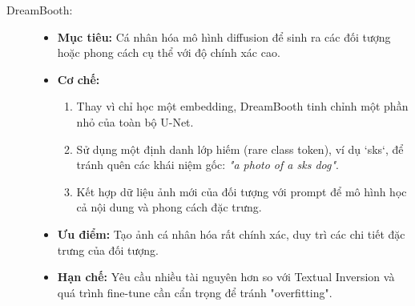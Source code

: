 \begin{description}
	\item[DreamBooth:] \cite{Ruiz2023_dreambooth}
	\begin{itemize}
		\item \textbf{Mục tiêu:} Cá nhân hóa mô hình diffusion để sinh ra các đối tượng hoặc phong cách cụ thể với độ chính xác cao.
		\item \textbf{Cơ chế:} 
		\begin{enumerate}
			\item Thay vì chỉ học một embedding, DreamBooth tinh chỉnh một phần nhỏ của toàn bộ U-Net.
			\item Sử dụng một định danh lớp hiếm (rare class token), ví dụ `sks`, để tránh quên các khái niệm gốc: \textit{"a photo of a sks dog"}.
			\item Kết hợp dữ liệu ảnh mới của đối tượng với prompt để mô hình học cả nội dung và phong cách đặc trưng.
		\end{enumerate}
		\item \textbf{Ưu điểm:} Tạo ảnh cá nhân hóa rất chính xác, duy trì các chi tiết đặc trưng của đối tượng.
		\item \textbf{Hạn chế:} Yêu cầu nhiều tài nguyên hơn so với Textual Inversion và quá trình fine-tune cần cẩn trọng để tránh "overfitting".
	\end{itemize}
	

\end{description}
